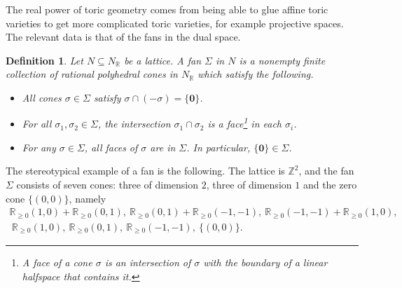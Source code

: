 \documentclass[11pt]{article}
\numberwithin{equation}{section}
\numberwithin{footnote}{section}
\newtheorem{defn}[thm]{Definition}
\newcommand{\blue}{\color{blue}}
\newcommand{\R}{{\mathbb R}}
\newcommand{\Z}{{\mathbb Z}}
\begin{document}
The real power of toric geometry comes from being able to glue affine toric varieties to get more complicated toric varieties,
for example projective spaces. The relevant data is that of the {\blue fans} in the dual space.

\smallskip
\begin{defn}
Let $N\subseteq N_\R$ be a lattice. A fan $\Sigma$ in $N$ is a nonempty finite collection of rational polyhedral cones in $N_\R$ which satisfy the following.
\begin{itemize}
\item All cones $\sigma\in\Sigma$ satisfy $\sigma \cap (-\sigma)=\{{\mathbf 0}\}$. 
\item For all  $\sigma_1,\sigma_2\in \Sigma$, the intersection $\sigma_1\cap\sigma_2$ is a face\footnote{ A face of a cone  $\sigma$ is an intersection of $\sigma$ with the boundary of a linear halfspace that contains it.} in each $\sigma_i$.
\item For any $\sigma\in \Sigma$, all faces of $\sigma$ are in $\Sigma$. In particular, $\{{\mathbf 0}\}\in\Sigma$. 
\end{itemize}
\end{defn}

\smallskip
The stereotypical example of a fan is the following.
The lattice is $\Z^2$, and the fan $\Sigma$ consists of seven cones: three of dimension $2$, three of dimension $1$ and the zero cone $\{(0,0)\}$, namely
\begin{equation}\label{fanCP2}
\begin{array}{c}
\R_{\geq 0} (1,0)+\R_{\geq 0} (0,1),~\R_{\geq 0} (0,1)+\R_{\geq 0} (-1,-1),~
\R_{\geq 0} (-1,-1)+\R_{\geq 0} (1,0),\\
~\R_{\geq 0} (1,0),~\R_{\geq 0} (0,1),~\R_{\geq 0} (-1,-1),~\{(0,0)\}.
\end{array}
\end{equation}

\end{document}

